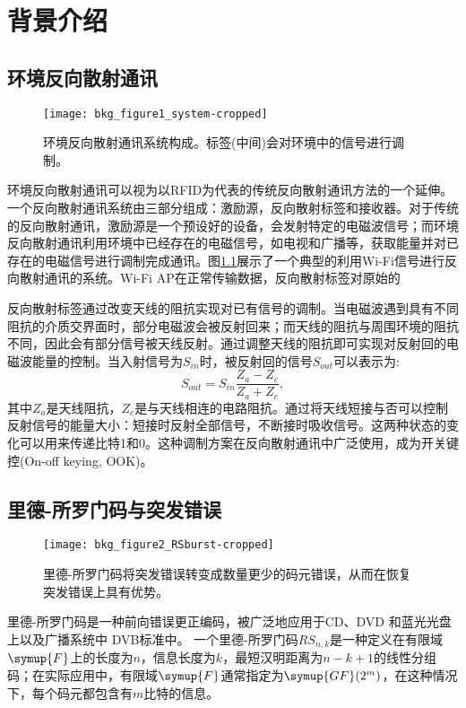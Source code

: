 \chapter{背景介绍}
\label{chap:background}
\section{环境反向散射通讯}
\begin{figure}
	\centering
	\texttt{[image: bkg\_figure1\_system-cropped]}
	\caption{环境反向散射通讯系统构成。标签(中间)会对环境中的信号进行调制。}
	\label{fig:system}
\end{figure}
环境反向散射通讯可以视为以RFID为代表的传统反向散射通讯方法的一个延伸。一个反向散射通讯系统由三部分组成：激励源，反向散射标签和接收器。对于传统的反向散射通讯，激励源是一个预设好的设备，会发射特定的电磁波信号；而环境反向散射通讯利用环境中已经存在的电磁信号，如电视和广播等，获取能量并对已存在的电磁信号进行调制完成通讯。图\ref{fig:system}展示了一个典型的利用Wi-Fi信号进行反向散射通讯的系统。Wi-Fi AP在正常传输数据，反向散射标签对原始的

反向散射标签通过改变天线的阻抗实现对已有信号的调制。当电磁波遇到具有不同阻抗的介质交界面时，部分电磁波会被反射回来；而天线的阻抗与周围环境的阻抗不同，因此会有部分信号被天线反射。通过调整天线的阻抗即可实现对反射回的电磁波能量的控制。当入射信号为$S_{in}$时，被反射回的信号$S_{out}$可以表示为:
\begin{equation}
S_{out} = S_{in} \frac{Z_a - Z_c}{Z_a + Z_c},
\end{equation}
其中$Z_a$是天线阻抗，$Z_c$是与天线相连的电路阻抗。通过将天线短接与否可以控制反射信号的能量大小：短接时反射全部信号，不断接时吸收信号。这两种状态的变化可以用来传递比特1和0。这种调制方案在反向散射通讯中广泛使用，成为开关键控(On-off keying, OOK)。
\section{里德-所罗门码与突发错误}
\begin{figure}
	\centering
	\texttt{[image: bkg\_figure2\_RSburst-cropped]}
	\caption{里德-所罗门码将突发错误转变成数量更少的码元错误，从而在恢复突发错误上具有优势。}
	\label{fig:rscode}
\end{figure}
里德-所罗门码是一种前向错误更正编码，被广泛地应用于CD、DVD 和蓝光光盘上以及广播系统中 DVB标准中。 
一个里德-所罗门码$RS_{n,k}$是一种定义在有限域$\symup{F}$上的长度为$n$，信息长度为$k$，最短汉明距离为$n-k+1$的线性分组码；在实际应用中，有限域$\symup{F}$通常指定为$\symup{GF}(2^m)$，在这种情况下，每个码元都包含有$m$比特的信息。

